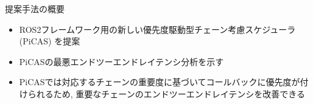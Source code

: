 
\begin{frame}{提案手法の概要}
    \begin{itemize}
        \item ROS2フレームワーク用の新しい優先度駆動型チェーン考慮スケジューラ (PiCAS) を提案
        \item PiCASの最悪エンドツーエンドレイテンシ分析を示す
        \item PiCASでは対応するチェーンの重要度に基づいてコールバックに優先度が付けられるため, 重要なチェーンのエンドツーエンドレイテンシを改善できる
    \end{itemize}
\end{frame}



